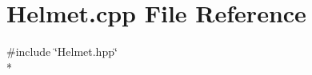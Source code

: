\section{Helmet.\-cpp File Reference}
\label{_helmet_8cpp}
{\ttfamily \#include \char`\"{}Helmet.\-hpp\char`\"{}}\\*
